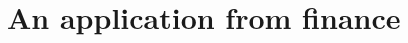 \documentclass{article}
\newcommand{\1}{\mathbbm{1}}
\newtheorem{proposition}[theorem]{Proposition}
\begin{document}

\appendix
\section{An application from finance}
\end{document}
